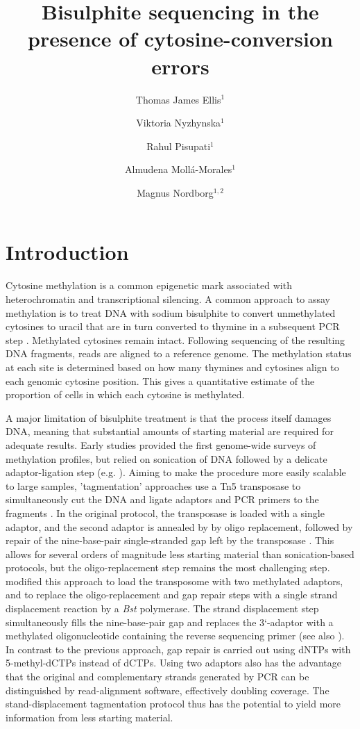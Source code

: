 \documentclass[twocolumn,twoside,lettersize]{article}
\title{Bisulphite sequencing in the presence of cytosine-conversion errors}
\author{
    Thomas James Ellis$^1$
    \and
    Viktoria Nyzhynska$^1$
    \and
    Rahul Pisupati$^1$
    \and
    Almudena Moll\'a-Morales$^1$
    \and
    Magnus Nordborg$^{1,2}$
}
\date{
 \begin{list}{}{%
      \setlength{\leftmargin}{0cm}%
      \setlength{\rightmargin}{\leftmargin}}%
  \item\normalsize\bf 
    Bisulphite treatment of DNA converts unmethylated cytosines to thymine, and is a common method to infer the methylation status of cytosines when coupled with sequencing.
    'Tagmentation' approaches to bisulphite sequencing use a transposase to simultaneously make double-stranded breaks and ligate adaptors to the resulting fragments, allowing for higher throughput with less starting material.
    However, it has also been noted that certain tagmentation protocols have an unusually high number unmethylated cytosines that are not converted to thymine.
    Here we describe this phenomenon in detail, and find that results are consistent with single strand nicks by the transposase, followed by strand displacement of part or all of the DNA fragment, leading to erroneous incorporation of methylated cytosines.
    Nevertheless we show that these errors can be accounted for in downstream analysis and need not impede biological conclusions.
    We provide a Python package to allow users to implement this framework.
    Ultimately the additional effort of accounting for errors must be traded off against the scalability of the protocol in planning experiments.
  \end{list}
}
\begin{document}
\maketitle

\section{Introduction}

Cytosine methylation is a common epigenetic mark associated with heterochromatin and transcriptional silencing.
A common approach to assay methylation is to treat DNA with sodium bisulphite to convert unmethylated cytosines to uracil that are in turn converted to thymine in a subsequent PCR step \parencite{clark1994high}.
Methylated cytosines remain intact.
Following sequencing of the resulting DNA fragments, reads are aligned to a reference genome.
The methylation status at each site is determined based on how many thymines and cytosines align to each genomic cytosine position.
This gives a quantitative estimate of the proportion of cells in which each cytosine is methylated.

A major limitation of bisulphite treatment is that the process itself damages DNA, meaning that substantial amounts of starting material are required for adequate results.
Early studies provided the first genome-wide surveys of methylation profiles, but relied on sonication of DNA followed by a delicate adaptor-ligation step (e.g. \cite{meissner2005reduced, cokus2008shotgun, lister2009human}).
Aiming to make the procedure more easily scalable to large samples, 'tagmentation' approaches use a Tn5 transposase to simultaneously cut the DNA and ligate adaptors and PCR primers to the fragments \parencite{wang2013tagmentation}.
In the original protocol, the transposase is loaded with a single adaptor, and the second adaptor is annealed by by oligo replacement, followed by repair of the nine-base-pair single-stranded gap left by the transposase \parencite{adey2012ultra}.
This allows for several orders of magnitude less starting material than sonication-based protocols, but the oligo-replacement step remains the most challenging step.
\textcite{lu2015improved} modified this approach to load the transposome with two methylated adaptors, and to replace the oligo-replacement and gap repair steps with a single strand displacement reaction by a \textit{Bst} polymerase.
The strand displacement step simultaneously fills the nine-base-pair gap and replaces the 3`-adaptor with a methylated oligonucleotide containing the
reverse sequencing primer (see also \cite{weichenhan2019generation, suzuki2018whole}).
In contrast to the previous approach, gap repair is carried out using dNTPs with 5-methyl-dCTPs instead of dCTPs.
Using two adaptors also has the advantage that the original and complementary strands generated by PCR can be distinguished by read-alignment software, effectively doubling coverage. 
The stand-displacement tagmentation protocol thus has the potential to yield more information from less starting material.
\end{document}
